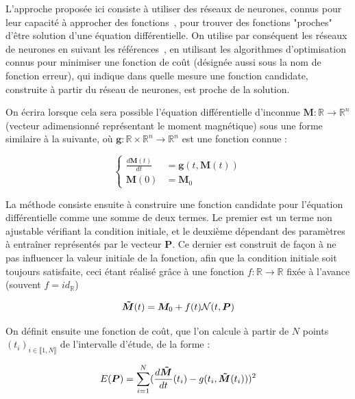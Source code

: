 \documentclass[12pt]{report}
\begin{document}
L'approche proposée ici consiste à utiliser des réseaux de neurones, connus pour leur capacité à approcher des fonctions~\cite{FunctionApproximation}, pour trouver des fonctions "proches" d'être solution d'une équation différentielle.
On utilise par conséquent les réseaux de neurones en suivant les références~\cite{MLWithApp,ANNforOPDEs,HighOrderHybrid}, en utilisant les algorithmes d'optimisation connus pour minimiser une fonction de coût (désignée aussi sous la nom de fonction erreur), qui indique dans quelle mesure une fonction candidate, construite à partir du réseau de neurones, est proche de la solution.

On écrira lorsque cela sera possible l'équation différentielle d'inconnue $\bm{M}: \mathbb{R} \to  \mathbb{R}^n$ (vecteur adimensionné représentant le moment magnétique) sous une forme similaire à la suivante, où $\bm{g}:  \mathbb{R}\times\mathbb{R}^n \to  \mathbb{R}^n$ est une fonction connue :

\begin{equation}
    \left\{
        \begin{aligned}
            \frac{d\bm{M}(t)}{dt} &= \bm{g}(t, \bm{M}(t)) \\
            \bm{M}(0) &= \bm{M}_0
        \end{aligned}
    \right.
\label{eq:equa_dif_example}
\end{equation}

La méthode consiste ensuite à construire une fonction candidate pour l'équation différentielle comme une somme de deux termes.
Le premier est un terme non ajustable vérifiant la condition initiale, et le deuxième dépendant des paramètres à entraîner représentés par le vecteur $\bm{P}$. Ce dernier est construit de façon à ne pas influencer la valeur initiale de la fonction, afin que la condition initiale soit toujours satisfaite, ceci étant réalisé grâce à une fonction $f:\mathbb{R}\to\mathbb{R}$ fixée à l'avance (souvent $f = id_{\mathbb{R}}$)

\begin{equation}
    \bm{\Tilde{M}}(t) = \bm{M}_0 + f(t)\mathcal{N}(t,\bm{P}) 
\label{eq:solution_candidate_generique}
\end{equation}
    
On définit ensuite une fonction de coût, que l'on calcule à partir de $N$ points $(t_i)_{i\in \llbracket 1, N \rrbracket}$ de l'intervalle d'étude, de la forme :

\begin{equation}
    E ({\bm P})= \sum_{i=1}^{N} (\frac{d\bm{\Tilde{M}}}{dt}(t_i) -g(t_i, \bm{\Tilde{M}}(t_i)))^2   
\label{eq:fonction_erreur_generique}
\end{equation}
\end{document}
